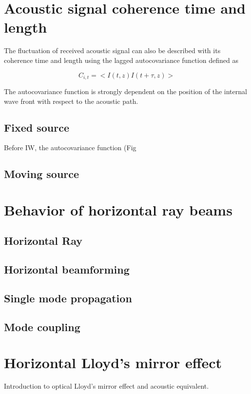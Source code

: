 
\section{Acoustic signal coherence time and length}
The fluctuation of received acoustic signal can also be described with its coherence time and length using the lagged autocovariance function defined as


\begin{equation}\label{eq:autocov}
C_{i,t}=<I(t,z)I(t+\tau,z)>
\end{equation}

The autocovariance function is strongly dependent on the position of the internal wave front with respect to the acoustic path. 
\subsection{Fixed source}
Before IW, the autocovariance function (Fig
\subsection{Moving source}
\section{Behavior of horizontal ray beams}
\subsection{Horizontal Ray}
\subsection{Horizontal beamforming}
\subsection{Single mode propagation}
\subsection{Mode coupling}
\section{Horizontal Lloyd's mirror effect}
Introduction to optical Lloyd's mirror effect and acoustic equivalent.
